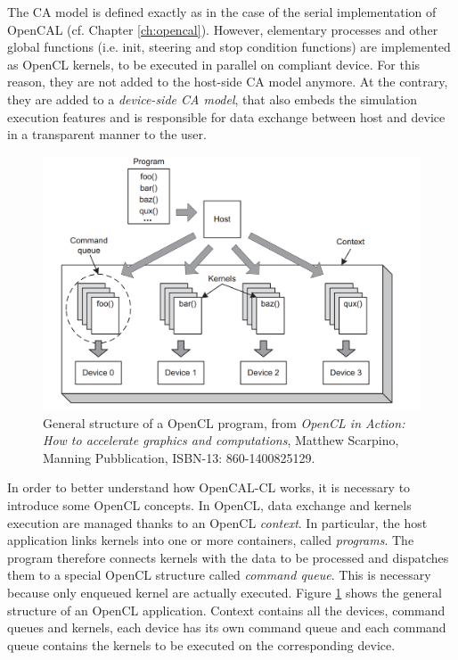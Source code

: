 The CA model is defined exactly as in the case of the serial
implementation of OpenCAL (cf. Chapter \ref{ch:opencal}). However,
elementary processes and other global functions (i.e. init, steering
and stop condition functions) are implemented as OpenCL kernels, to be
executed in parallel on compliant device. For this reason, they are
not added to the host-side CA model anymore. At the contrary, they are
added to a \emph{device-side CA model}, that also embeds the
simulation execution features and is responsible for data exchange
between host and device in a transparent manner to the user.

\begin{figure}[tp]
  \begin{center}
    \includegraphics[width=12cm]{./images/OpenCAL-CL/kernelDistribution}
    \caption{General structure of a OpenCL program, from \emph{OpenCL
        in Action: How to accelerate graphics and computations},
      Matthew Scarpino, Manning Pubblication, ISBN-13:
      860-1400825129.}
    \label{fig:GeneralStructure}
  \end{center}
\end{figure}

In order to better understand how OpenCAL-CL works, it is necessary to
introduce some OpenCL concepts. In OpenCL, data exchange and kernels
execution are managed thanks to an OpenCL \emph{context}. In
particular, the host application links kernels into one or more
containers, called \emph{programs}. The program therefore connects
kernels with the data to be processed and dispatches them to a special
OpenCL structure called \emph{command queue}. This is necessary
because only enqueued kernel are actually executed. Figure
\ref{fig:GeneralStructure} shows the general structure of an OpenCL
application. Context contains all the devices, command queues and
kernels, each device has its own command queue and each command queue
contains the kernels to be executed on the corresponding device.

